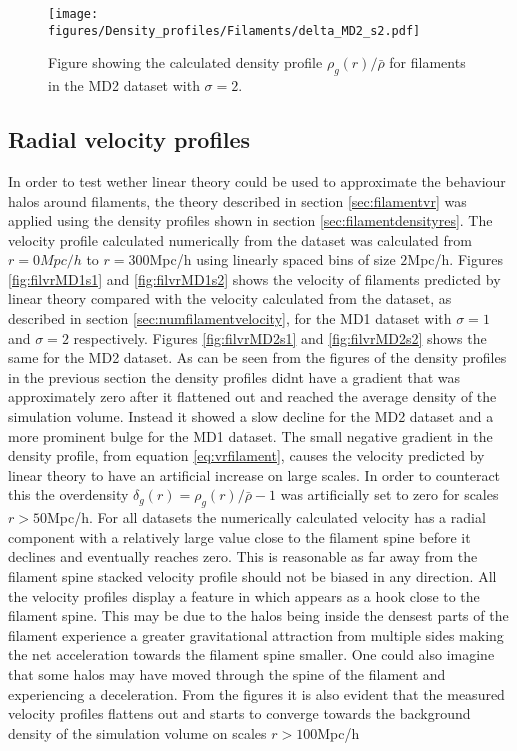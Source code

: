 \begin{figure}[H]
    \texttt{[image: figures/Density\_profiles/Filaments/delta\_MD2\_s2.pdf]}
    \caption{Figure showing the calculated density profile $\rho_g(r)/\bar{\rho}$ for filaments in the MD2 dataset with $\sigma=2$.}
    \label{fig:fildensitytMD2s2}
\end{figure}
\subsection{Radial velocity profiles}
In order to test wether linear theory could be used to approximate the behaviour halos around filaments, the theory described in section \ref{sec:filamentvr} was applied using the density profiles shown in section \ref{sec:filamentdensityres}. The velocity profile calculated numerically from the dataset was calculated from $r=0Mpc/h$ to $r=300$Mpc/h using linearly spaced bins of size $2$Mpc/h. Figures \ref{fig:filvrMD1s1} and \ref{fig:filvrMD1s2} shows the velocity of filaments predicted by linear theory compared with the velocity calculated from the dataset, as described in section \ref{sec:numfilamentvelocity}, for the MD1 dataset with $\sigma=1$ and $\sigma=2$ respectively. Figures \ref{fig:filvrMD2s1} and \ref{fig:filvrMD2s2} shows the same for the MD2 dataset. As can be seen from the figures of the density profiles in the previous section the density profiles didnt have a gradient that was approximately zero after it flattened out and reached the average density of the simulation volume. Instead it showed a slow decline for the MD2 dataset and a more prominent bulge for the MD1 dataset. The small negative gradient in the density profile, from equation \ref{eq:vrfilament}, causes the velocity predicted by linear theory to have an artificial increase on large scales. In order to counteract this the overdensity $\delta_g(r)=\rho_g(r)/\bar{\rho}-1$ was artificially set to zero for scales $r>50$Mpc/h. For all datasets the numerically calculated velocity has a radial component with a relatively large value close to the filament spine before it declines and eventually reaches zero. This is reasonable as far away from the filament spine stacked velocity profile should not be biased in any direction. All the velocity profiles display a feature in which appears as a hook close to the filament spine. This may be due to the halos being inside the densest parts of the filament experience a greater gravitational attraction from multiple sides making the net acceleration towards the filament spine smaller. One could also imagine that some halos may have moved through the spine of the filament and experiencing a deceleration. From the figures it is also evident that the measured velocity profiles flattens out and starts to converge towards the background density of the simulation volume on scales $r>100$Mpc/h \\\indent
